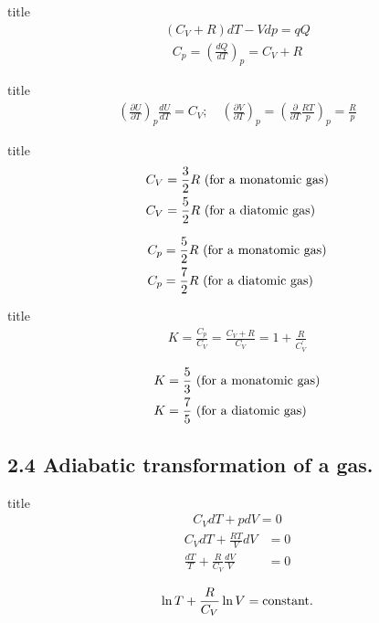 \documentclass[dvipdfmx, 10pt, aspectratio = 169]{beamer}
\begin{document}
\begin{frame}{title}
	\begin{align}
		(C_V + R)dT - Vdp = qQ
	\end{align}
	\begin{align}
		C_p = \left( \frac{dQ}{dT} \right)_p = C_V + R
	\end{align}
\end{frame}

\begin{frame}{title}
	\begin{align}
		\left( \frac{\partial U}{\partial T} \right)_p \frac{dU}{dT} = C_V; \quad \left( \frac{\partial V}{\partial T} \right)_p = \left( \frac{\partial}{\partial T} \frac{RT}{p} \right)_p = \frac{R}{p}
	\end{align}
\end{frame}

\begin{frame}{title}
	\begin{align}
		C_V &= \frac{3}{2}R \ ({\rm for \ a \ monatomic \ gas} ) \notag \\
		C_V &= \frac{5}{2}R \ ({\rm for \ a \ diatomic \ gas})
	\end{align}
	
	\begin{align}
		C_p &= \frac{5}{2} R \ ({\rm for \ a \ monatomic \ gas}) \notag \\
		C_p &= \frac{7}{2} R \ ({\rm for \ a \ diatomic \ gas})
	\end{align}
\end{frame}

\begin{frame}{title}
\begin{align}
	K = \frac{C_p}{C_V} = \frac{C_V + R}{C_V} = 1 + \frac{R}{C_V^\prime}
\end{align}

\begin{align}
	K &= \frac{5}{3} \ ({\rm for \ a \ monatomic \ gas}) \notag \\
	K &= \frac{7}{5} \ ({\rm for \ a \ diatomic \ gas})
\end{align}
\end{frame}
\subsection{2.4 Adiabatic transformation of a gas.}

\begin{frame}{title}
	\begin{align*}
		C_V dT + pdV = 0
	\end{align*}
	\begin{align*}
		C_V dT + \frac{RT}{V}dV &= 0 \\
		\frac{dT}{T} + \frac{R}{C_V}\frac{dV}{V} &= 0
	\end{align*}
	
	\begin{align*}
		\ln T + \frac{R}{C_V} \ln V = {\rm constant.}
	\end{align*}
\end{frame}
\end{document}
